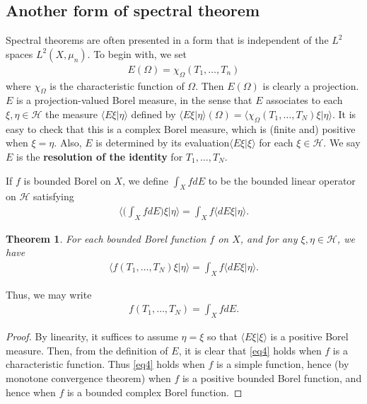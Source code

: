 \documentclass[12pt,b5paper,notitlepage]{article}
\theoremstyle{definition}
\theoremstyle{plain}
\newtheorem{thm}[df]{Theorem}
\newcommand{\mc}{\mathcal}
\newcommand{\bk}[1]{\langle {#1}\rangle}
\numberwithin{equation}{section}
\begin{document}
\subsection*{Another form of spectral theorem}





Spectral theorems are often presented in a form that is independent of the $L^2$ spaces $L^2(X,\mu_n)$. To begin with, we set
\begin{align}
E(\Omega)=\chi_\Omega(T_1,\dots,T_n)
\end{align}
where $\chi_\Omega$  is the characteristic function of $\Omega$. Then $E(\Omega)$ is clearly a projection. $E$ is a projection-valued Borel measure, in the sense that $E$ associates to each $\xi,\eta\in\mc H$ the measure $\bk{E\xi|\eta}$ defined by $\bk{E\xi|\eta}(\Omega)=\bk{\chi_\Omega(T_1,\dots,T_N)\xi|\eta}$. It is easy to check that this is a complex Borel measure, which is (finite and) positive when $\xi=\eta$. Also, $E$ is determined by its evaluation$\bk{E\xi|\xi}$ for each $\xi\in\mc H$. We say $E$ is the \textbf{resolution of the identity} for $T_1,\dots,T_N$.

If $f$ is bounded Borel on $X$, we define $\int_XfdE$ to be the bounded linear operator on $\mc H$ satisfying
\begin{align*}
\Big\langle \Big(\int_XfdE\Big)\xi|\eta \Big\rangle=\int_X f\bk{dE\xi|\eta}.	
\end{align*}

\begin{thm}\label{lb49}
For each bounded Borel function $f$ on $X$, and for any $\xi,\eta\in\mc H$, we have
\begin{align}\label{eq4}
\bk{f(T_1,\dots,T_N)\xi|\eta}=\int_Xf\bk{dE\xi|\eta}.	
\end{align}
\end{thm}

Thus, we may write 
\begin{align}
f(T_1,\dots,T_N)=\int_X fdE.
\end{align}

\begin{proof}
By linearity, it suffices to assume $\eta=\xi$ so that $\bk{E\xi|\xi}$ is a positive Borel measure. Then, from the definition of $E$, it is clear that \eqref{eq4} holds when $f$ is a characteristic function.  Thus \eqref{eq4} holds when $f$ is a simple function, hence (by monotone convergence theorem) when $f$ is a positive bounded Borel function, and hence when $f$ is a bounded complex Borel function. 
\end{proof}
\end{document}
